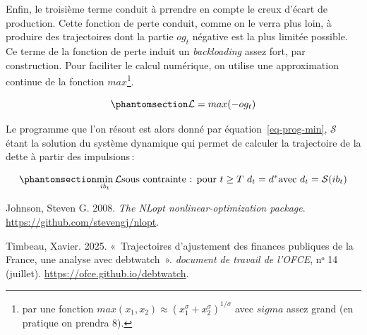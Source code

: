 \documentclass[
  french,
  9pt,
  a4paper,
  DIV=11,
  twoside=semi]{scrreprt}
\newlength{\cslhangindent}
\newenvironment{CSLReferences}[2] %
 {\begin{list}{}{%
  \setlength{\itemindent}{0pt}
  \setlength{\leftmargin}{0pt}
  \setlength{\parsep}{0pt}
  \ifodd #1
   \setlength{\leftmargin}{\cslhangindent}
   \setlength{\itemindent}{-1\cslhangindent}
  \fi
  \setlength{\itemsep}{#2\baselineskip}}}
 {\end{list}}
\begin{document}
Enfin, le troisième terme conduit à prrendre en compte le creux d'écart
de production. Cette fonction de perte conduit, comme on le verra plus
loin, à produire des trajectoires dont la partie \(og_t\) négative est
la plus limitée possible. Ce terme de la fonction de perte induit un
\emph{backloading} assez fort, par construction. Pour faciliter le
calcul numérique, on utilise une approximation continue de la fonction
\(max\)\footnote{par une fonction
  \(max(x_1,x_2) \approx (x_1^\sigma + x_2^\sigma)^{1/\sigma}\) avec
  \(sigma\) assez grand (en pratique on prendra 8).}.

\begin{equation}\protect\phantomsection\label{eq-perte-min}{
\mathcal{L} = max(-og_t)
}\end{equation}

Le programme que l'on résout est alors donné par
équation~\ref{eq-prog-min}, \(\mathcal{S}\) étant la solution du système
dynamique qui permet de calculer la trajectoire de la dette à partir des
impulsions\,:

\begin{equation}\protect\phantomsection\label{eq-prog-min}{
\min_{ib_{t}}\mathcal{L} \\
\text{sous contrainte : pour } t\geq T \text{  } d_t = d^* \\
\text{avec } d_t = \mathcal{S}(ib_t)
}\end{equation}

\protect{}\label{refs}
\begin{CSLReferences}{1}{1}
Johnson, Steven G. 2008. \emph{The NLopt nonlinear-optimization
package}. \url{https://github.com/stevengj/nlopt}.

Timbeau, Xavier. 2025. {«~Trajectoires d'ajustement des finances
publiques de la France, une analyse avec debtwatch~»}. \emph{document de
travail de l'OFCE}, nᵒ 14 (juillet).
\url{https://ofce.github.io/debtwatch}.

\end{CSLReferences}
\end{document}
